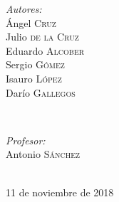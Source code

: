 \documentclass[12pt]{article}
\begin{document}
\begin{titlepage}

\begin{minipage}{0.4\textwidth}
\begin{flushleft} \large
\emph{Autores:}\\
Ángel \textsc{Cruz} \\ %
Julio \textsc{de la Cruz} \\
Eduardo \textsc{Alcober}\\
Sergio \textsc{Gómez}\\
Isauro \textsc{López}\\
Darío \textsc{Gallegos}
\end{flushleft}
\end{minipage}
~
\begin{minipage}{0.4\textwidth}
\begin{flushright} \large
\emph{Profesor:} \\
Antonio \textsc{Sánchez} %
\end{flushright}
\end{minipage}\\[0.85cm]


{\large 11 de noviembre de 2018}\\[0.5cm] %



\vfill %

\end{titlepage}



\tableofcontents %
\newpage

\end{document}
